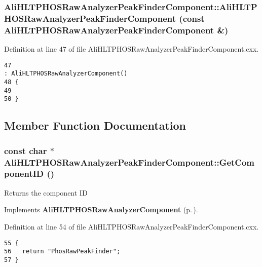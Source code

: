 \subsubsection{\setlength{\rightskip}{0pt plus 5cm}Ali\-HLTPHOSRaw\-Analyzer\-Peak\-Finder\-Component::Ali\-HLTPHOSRaw\-Analyzer\-Peak\-Finder\-Component (const {\bf Ali\-HLTPHOSRaw\-Analyzer\-Peak\-Finder\-Component} \&)\hspace{0.3cm}{\tt  [private]}}\label{classAliHLTPHOSRawAnalyzerPeakFinderComponent_d2}




Definition at line 47 of file Ali\-HLTPHOSRaw\-Analyzer\-Peak\-Finder\-Component.cxx.

\footnotesize\begin{verbatim}47                                                                                                                                     : AliHLTPHOSRawAnalyzerComponent()
48 {
49 
50 }
\end{verbatim}\normalsize 




\subsection{Member Function Documentation}
\subsubsection{\setlength{\rightskip}{0pt plus 5cm}const char $\ast$ Ali\-HLTPHOSRaw\-Analyzer\-Peak\-Finder\-Component::Get\-Component\-ID ()\hspace{0.3cm}{\tt  [virtual]}}\label{classAliHLTPHOSRawAnalyzerPeakFinderComponent_a2}


Returns the component ID 

Implements {\bf Ali\-HLTPHOSRaw\-Analyzer\-Component} {\rm (p.\,\pageref{classAliHLTPHOSRawAnalyzerComponent_a12})}.

Definition at line 54 of file Ali\-HLTPHOSRaw\-Analyzer\-Peak\-Finder\-Component.cxx.

\footnotesize\begin{verbatim}55 {
56   return "PhosRawPeakFinder";
57 }
\end{verbatim}\normalsize 


